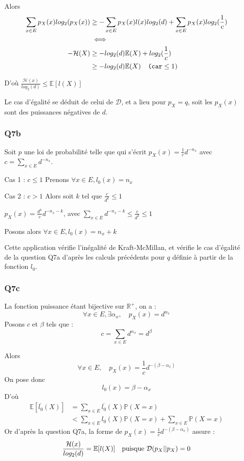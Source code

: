 \documentclass[a4paper,twoside,10pt]{article}
\renewcommand{\H}{\mathcal{H}}
\newcommand{\D}{\mathcal{D}}
\begin{document}
Alors
\begin{align*}
\sum_{x \in E}p_X(x)log_2(p_X(x)) &\geq  -\sum_{x \in E}p_X(x)l(x)log_2(d) + \sum_{x \in E}p_X(x)log_2(\frac{1}{c}) \\
 &\iff\\
-\H(X) &\geq -log_2(d) \mathbb{E}(X) + log_2(\frac{1}{c})
\\ &\geq -log_2(d) \mathbb{E}(X) \texttt{\quad(car} \leq 1 \textsc{)}
\end{align*}

D'où $\frac{\H(x)}{log_2(d)} \leq \mathbb{E}[l(X)]$
 
Le cas d'égalité se déduit de celui de $\D$, et a lieu pour $p_X = q$, soit les $p_X(x)$ sont des puissances négatives de $d$.
 

\subsubsection*{Q7b}
Soit $p$ une loi de probabilité telle que qui s'écrit $p_X(x) = \frac{1}{c}d^{-n_x}$ avec $c = \sum_{x \in E} d^{-n_x}$.

Cas 1 : $c \leq 1$ Prenons $\forall x \in E, l_0(x) = n_x$

Cas 2 : $c > 1$ Alors soit $k$ tel que $\frac{c}{d^k} \leq 1$

$p_X(x) = \frac{d^k}{c}d^{-n_x - k}$, avec $\sum_{x \in E} d^{-n_x - k} \leq \frac{c}{d^k} \leq 1$

Posons alors $\forall x \in E, l_0(x) = n_x + k$

Cette application vérifie l'inégalité de Kraft-McMillan, et vérifie le cas d'égalité de la question Q7a d'après les calculs
précédents pour $q$ définie à partir de la fonction $l_0$.

\subsubsection*{Q7c}
La fonction puissance étant bijective sur $\mathbb{R^+}$, on a :
\[
\forall x \in E, \exists \alpha_x, \quad p_X(x) = d ^{\alpha_x}
\]
Posons $c$ et $\beta$ tels que :
\[
c = \sum_{x \in E} d ^{\alpha_x} = d^\beta
\]

Alors
\[
\forall x \in E, \quad p_X(x) = \frac{1}{c} d^{-(\beta - \alpha_x)}
\]
On pose donc
\[
l_0(x) = \beta - \alpha_x
\]
D'où
\begin{align*}
\mathbb{E}[\overline{l_0}(X)] &= \sum_{x \in E} \overline{l_0}(X) \mathbb{P}(X=x)\\
&< \sum_{x \in E} l_0(X)\mathbb{P}(X=x) + \sum_{x \in E}\mathbb{P}(X=x)
\end{align*}
Or d'après la question Q7a, la forme de $p_X(x)= \frac{1}{c} d^{-(\beta - \alpha_x)}$ assure :
\[
\frac{\H(x)}{log_2(d)} = \mathbb{E}[l(X)] \text{\quad puisque } \D(p_X||p_X) = 0
\]
\end{document}
